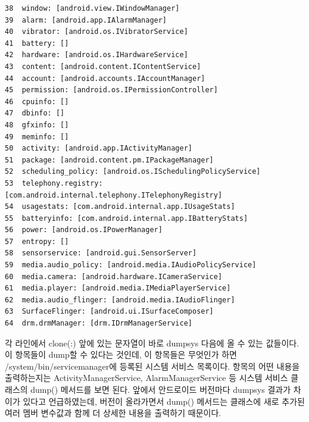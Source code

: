 \begin{lstlisting}[frame=single]
38	window: [android.view.IWindowManager]
39	alarm: [android.app.IAlarmManager]
40	vibrator: [android.os.IVibratorService]
41	battery: []
42	hardware: [android.os.IHardwareService]
43	content: [android.content.IContentService]
44	account: [android.accounts.IAccountManager]
45	permission: [android.os.IPermissionController]
46	cpuinfo: []
47	dbinfo: []
48	gfxinfo: []
49	meminfo: []
50	activity: [android.app.IActivityManager]
51	package: [android.content.pm.IPackageManager]
52	scheduling_policy: [android.os.ISchedulingPolicyService]
53	telephony.registry: [com.android.internal.telephony.ITelephonyRegistry]
54	usagestats: [com.android.internal.app.IUsageStats]
55	batteryinfo: [com.android.internal.app.IBatteryStats]
56	power: [android.os.IPowerManager]
57	entropy: []
58	sensorservice: [android.gui.SensorServer]
59	media.audio_policy: [android.media.IAudioPolicyService]
60	media.camera: [android.hardware.ICameraService]
61	media.player: [android.media.IMediaPlayerService]
62	media.audio_flinger: [android.media.IAudioFlinger]
63	SurfaceFlinger: [android.ui.ISurfaceComposer]
64	drm.drmManager: [drm.IDrmManagerService]
\end{lstlisting}

각 라인에서 clone(:) 앞에 있는 문자열이 바로 dumpsys 다음에 올 수 있는 값들이다.
이 항목들이 dump할 수 있다는 것인데, 이 항목들은 무엇인가 하면 /system/bin/servicemanager에 등록된 시스템 서비스 목록이다.
항목의 어떤 내용을 출력하는지는 ActivityManagerService, AlarmManagerService 등 시스템 서비스 클래스의 dump() 메서드를 보면 된다. 
앞에서 안드로이드 버전마다 dumpsys 결과가 차이가 있다고 언급하였는데, 버전이 올라가면서 dump() 메서드는 클래스에 새로 추가된 여러 멤버 변수값과 함께 더 상세한 내용을 출력하기 때문이다.\\

